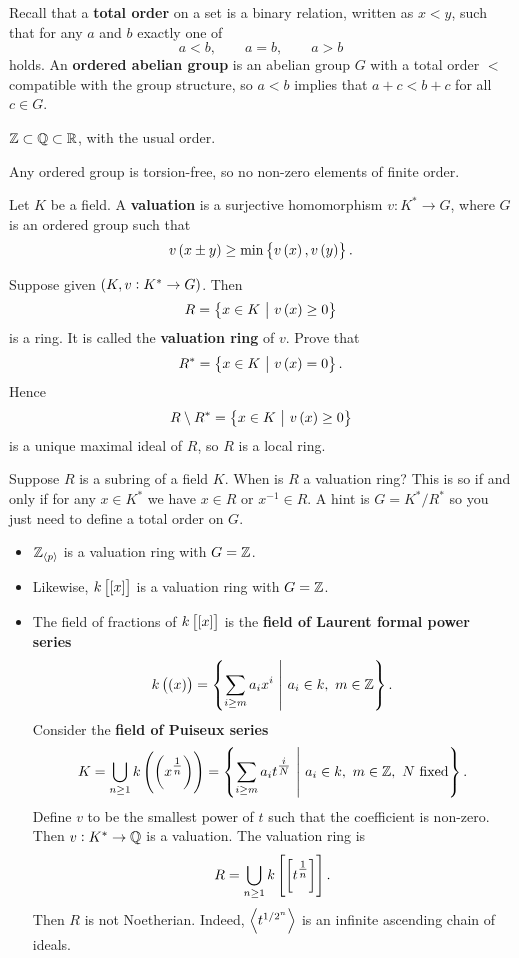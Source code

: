 Recall that a \textbf{total order} on a set is a binary relation, written as $ x < y $, such that for any $ a $ and $ b $ exactly one of
$$ a < b, \qquad a = b, \qquad a > b $$
holds. An \textbf{ordered abelian group} is an abelian group $ G $ with a total order $ < $ compatible with the group structure, so $ a < b $ implies that $ a + c < b + c $ for all $ c \in G $.

\begin{example*}
$ \mathbb{Z} \subset \mathbb{Q} \subset \mathbb{R} $, with the usual order.
\end{example*}

\begin{exercise*}
Any ordered group is torsion-free, so no non-zero elements of finite order.
\end{exercise*}

\begin{definition}
Let $ K $ be a field. A \textbf{valuation} is a surjective homomorphism $ v : K^* \to G $, where $ G $ is an ordered group such that
$$ v\br{x \pm y} \ge \min\cbr{v\br{x}, v\br{y}}. $$
\end{definition}

\begin{exercise*}
Suppose given $ \br{K, v: K^* \to G} $. Then
$$ R = \cbr{x \in K \st v\br{x} \ge 0} $$
is a ring. It is called the \textbf{valuation ring} of $ v $. Prove that
$$ R^* = \cbr{x \in K \st v\br{x} = 0}. $$
Hence
$$ R \setminus R^* = \cbr{x \in K \st v\br{x} \ge 0} $$
is a unique maximal ideal of $ R $, so $ R $ is a local ring.
\end{exercise*}

\pagebreak

\begin{exercise*}
Suppose $ R $ is a subring of a field $ K $. When is $ R $ a valuation ring? This is so if and only if for any $ x \in K^* $ we have $ x \in R $ or $ x^{-1} \in R $. A hint is $ G = K^* / R^* $ so you just need to define a total order on $ G $.
\end{exercise*}

\begin{example*}
\hfill
\begin{itemize}
\item $ \mathbb{Z}_{\left\langle p \right\rangle} $ is a valuation ring with $ G = \mathbb{Z} $.
\item Likewise, $ k\sbr{\sbr{x}} $ is a valuation ring with $ G = \mathbb{Z} $.
\item The field of fractions of $ k\sbr{\sbr{x}} $ is the \textbf{field of Laurent formal power series}
$$ k\br{\br{x}} = \cbr{\sum_{i \ge m} a_ix^i \st a_i \in k, \ m \in \ZZ}. $$
Consider the \textbf{field of Puiseux series}
$$ K = \bigcup_{n \ge 1} k\br{\br{x^{\tfrac{1}{n}}}} = \cbr{\sum_{i \ge m} a_it^{\tfrac{i}{N}} \st a_i \in k, \ m \in \ZZ, \ N \ \text{fixed}}. $$
Define $ v $ to be the smallest power of $ t $ such that the coefficient is non-zero. Then $ v : K^* \to \mathbb{Q} $ is a valuation. The valuation ring is
$$ R = \bigcup_{n \ge 1} k\sbr{\sbr{t^{\tfrac{1}{n}}}}. $$
Then $ R $ is not Noetherian. Indeed, $ \left\langle t^{1 / 2^n} \right\rangle $ is an infinite ascending chain of ideals.
\end{itemize}
\end{example*}

